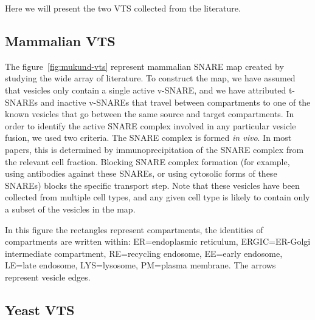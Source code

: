 Here we will present the two VTS collected from the literature.

\subsection{Mammalian VTS}


The figure~\ref{fig:mukund-vts} represent mammalian SNARE map
created by studying the wide array of literature.
% 
To construct the map, we have assumed that vesicles only contain a
single active v-SNARE, and we have attributed t-SNAREs and inactive
v-SNAREs that travel between compartments to one of the known vesicles
that go between the same source and target compartments.
%
In order to identify the active SNARE complex involved in any
particular vesicle fusion, we used two criteria.
%
The SNARE complex is formed \textit{in vivo}. In most papers, this is
determined by immunoprecipitation of the SNARE complex from the
relevant cell fraction.
%
Blocking SNARE complex formation (for example, using antibodies
against these SNAREs, or using cytosolic forms of these SNAREs) blocks
the specific transport step.
%
Note that these vesicles have been collected from multiple cell types, and
any given cell type is likely to contain only a subset of the vesicles in
the map.

In this figure the rectangles represent compartments, the identities
of compartments are written within: ER=endoplasmic reticulum,
ERGIC=ER-Golgi intermediate compartment, RE=recycling endosome,
EE=early endosome, LE=late endosome, LYS=lysosome, PM=plasma
membrane. The arrows represent vesicle edges.




\subsection{Yeast VTS}

